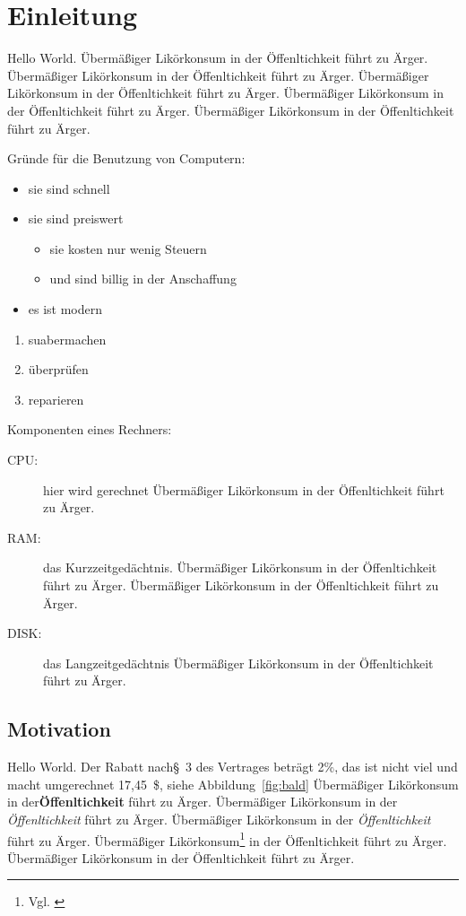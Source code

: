 

\section{Einleitung} 

Hello World.
Übermäßiger Likörkonsum in der Öffenltichkeit führt zu Ärger.
Übermäßiger Likörkonsum in der Öffenltichkeit führt zu Ärger.
Übermäßiger Likörkonsum in der Öffenltichkeit führt zu Ärger.
Übermäßiger Likörkonsum in der Öffenltichkeit führt zu Ärger.
Übermäßiger Likörkonsum in der Öffenltichkeit führt zu Ärger.

Gründe für die Benutzung von Computern:
\begin{itemize}
\item sie sind schnell
\item sie sind preiswert
\begin{itemize}
\item sie kosten nur wenig Steuern
\item und sind billig in der Anschaffung
\end{itemize}
\item es ist modern
\end{itemize}

\begin{enumerate}
\item suabermachen
\item überprüfen
\item reparieren
\end{enumerate}

Komponenten eines Rechners:
 \begin{description}
\item[CPU:] hier wird gerechnet
Übermäßiger Likörkonsum in der Öffenltichkeit führt zu Ärger.

\item[RAM:] das Kurzzeitgedächtnis. Übermäßiger Likörkonsum in der Öffenltichkeit führt zu Ärger.
Übermäßiger Likörkonsum in der Öffenltichkeit führt zu Ärger.

\item[DISK:] das Langzeitgedächtnis
Übermäßiger Likörkonsum in der Öffenltichkeit führt zu Ärger.
\end{description}
\subsection{Motivation}
Hello World. Der Rabatt nach\S~3 des Vertrages beträgt 2\%, das ist nicht viel und macht umgerechnet 17,45~\$, siehe Abbildung~\ref{fig:bald}
Übermäßiger Likörkonsum in der\textbf{Öffenltichkeit} führt zu Ärger. %
Übermäßiger Likörkonsum in der \textsl{Öffenltichkeit} führt zu Ärger.
Übermäßiger Likörkonsum in der \textit{Öffenltichkeit} führt zu Ärger.
Übermäßiger Likörkonsum\footnote{Vgl. \cite{Mitt95:Latex}} in der Öffenltichkeit führt zu Ärger.
Übermäßiger Likörkonsum in der Öffenltichkeit führt zu Ärger.


